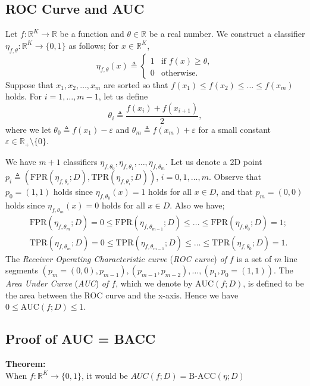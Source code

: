 \documentclass[a4paper,12pt,dvipdfmx]{article}
\begin{document}
\subsection{ROC Curve and AUC}
Let $f:\mathbb{R}^K\to\mathbb{R}$ be a function and $\theta\in\mathbb{R}$ be a real number.
We construct a classifier $\eta_{f,\theta}:\mathbb{R}^K\to\{0,1\}$ as follows; for $x\in\mathbb{R}^K$,
\[
\eta_{f,\theta}(x)\triangleq\left\{
\begin{array}{ll}
  1 & \textrm{if\ }f(x)\ge\theta,\\
  0 & \textrm{otherwise}.
\end{array}
\right.
\]
Suppose that $x_1,x_2,\dots,x_m$ are sorted
so that $f(x_1)\le f(x_2)\le\dots\le f(x_m)$ holds. 
For $i=1,\dots,m-1$, let us define
\[
\theta_i\triangleq\frac{f(x_i)+f(x_{i+1})}{2},
\]
where we let $\theta_0\triangleq f(x_1)-\varepsilon$ and
$\theta_m\triangleq f(x_m)+\varepsilon$ for a small constant $\varepsilon\in\mathbb{R}_+\setminus\{0\}$.

We have $m+1$ classifiers $\eta_{f,\theta_0},\eta_{f,\theta_1},\dots,\eta_{f,\theta_m}$. Let us denote a 2D point $p_i\triangleq(\textrm{FPR}(\eta_{f,\theta_i};D),\textrm{TPR}(\eta_{f,\theta_i};D))$, $i=0,1,\dots,m$. 
Observe that $p_0=(1,1)$ holds since $\eta_{f,\theta_0}(x)=1$ holds
for all $x\in D$,  and that
$p_m=(0,0)$ holds since $\eta_{f,\theta_m}(x)=0$ holds
for all $x\in D$.
Also we have;
\begin{align*}
  &\textrm{FPR}(\eta_{f,\theta_m};D)=0\le\textrm{FPR}(\eta_{f,\theta_{m-1}};D) \le\dots\le\textrm{FPR}(\eta_{f,\theta_0};D)=1;\\
  &\textrm{TPR}(\eta_{f,\theta_m};D)=0\le\textrm{TPR}(\eta_{f,\theta_{m-1}};D) \le\dots\le\textrm{TPR}(\eta_{f,\theta_0};D)=1.
\end{align*}
The {\em Receiver Operating Characteristic curve} ({\em ROC curve}) {\em of $f$}
is a set of $m$ line segments $(p_m=(0,0),p_{m-1}),(p_{m-1},p_{m-2}),\dots,(p_1,p_0=(1,1))$.
The {\em Area Under Curve} ({\em AUC}) {\em of $f$},
which we denote by $\textrm{AUC}(f;D)$,
is defined to be the area between the ROC curve and the x-axis.
Hence we have $0\le\textrm{AUC}(f;D)\le1$. 
\\


\newpage
\subsection{Proof of AUC = BACC}

\textbf{Theorem:}\\ 
  When $f:\mathbb{R}^K\to \{0,1\}$, it would be $AUC(f;D) = \textrm{B-ACC}(\eta; D)$\\
\end{document}
